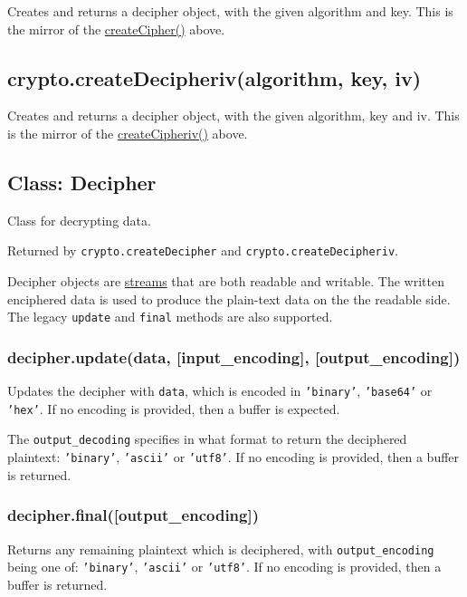 Creates and returns a decipher object, with the given algorithm and key.
This is the mirror of the
\hyperref[crypto\_crypto\_createcipher\_algorithm\_password]{createCipher()}
above.

\subsection{crypto.createDecipheriv(algorithm, key, iv)}

Creates and returns a decipher object, with the given algorithm, key and
iv. This is the mirror of the
\hyperref[crypto\_crypto\_createcipheriv\_algorithm\_key\_iv]{createCipheriv()}
above.

\subsection{Class: Decipher}

Class for decrypting data.

Returned by \texttt{crypto.createDecipher} and
\texttt{crypto.createDecipheriv}.

Decipher objects are \href{stream.html}{streams} that are both readable
and writable. The written enciphered data is used to produce the
plain-text data on the the readable side. The legacy \texttt{update} and
\texttt{final} methods are also supported.

\subsubsection{decipher.update(data, {[}input\_encoding{]},
{[}output\_encoding{]})}

Updates the decipher with \texttt{data}, which is encoded in
\texttt{'binary'}, \texttt{'base64'} or \texttt{'hex'}. If no encoding
is provided, then a buffer is expected.

The \texttt{output\_decoding} specifies in what format to return the
deciphered plaintext: \texttt{'binary'}, \texttt{'ascii'} or
\texttt{'utf8'}. If no encoding is provided, then a buffer is returned.

\subsubsection{decipher.final({[}output\_encoding{]})}

Returns any remaining plaintext which is deciphered, with
\texttt{output\_encoding} being one of: \texttt{'binary'},
\texttt{'ascii'} or \texttt{'utf8'}. If no encoding is provided, then a
buffer is returned.

